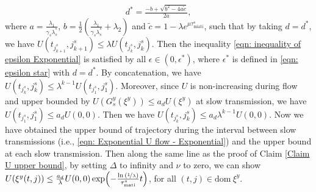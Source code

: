 \begin{equation}
d^* = \tfrac{-b+\sqrt{b^2-4a \tilde{c}}}{2a},
\label{eqn: d star exponential}
\end{equation}
where $a = \tfrac{\lambda_1}{\gamma_s \lambda_s^*}$, $b= \tfrac{1}{2}( \tfrac{\lambda_1}{\gamma_s \lambda_s^*} + \lambda_2)$ and $\tilde{c}= 1 - \lambda e^{\mu \tau_{\text{miati}}^s}$, such that by taking $d =d^*$, we have $U(t_{j_{k+1}^s}, j^s_{k+1}) \leq \lambda U(t_{j_k^s},j^s_k)$.
Then the inequality \eqref{eqn: inequality of epsilon Exponential} is satisfied by all $\epsilon \in (0, \epsilon^*)$, where $\epsilon^*$ is defined in \eqref{eqn: epsilon star} with $d = d^*$.
By concatenation, we have $U(t_{j_k^s}, j^s_k) \leq  \lambda^{k-1}U(t_{j_1^s}, j_1^s)$.
%
Moreover, since $U$ is non-increasing during flow and upper bounded by $U(G_s^y(\xi^y)) \leq a_d U(\xi^y)$ at slow transmission, we have $ U(t_{j_1^s},j_1^s) \leq  a_d U(0,0) $. Then we have $U(t_{j_k^s}, j_k^s) \leq a_d \lambda^{k-1} U(0,0)$.
%
Now we have obtained the upper bound of trajectory during the interval between slow transmissions (i.e., \eqref{eqn: Exponential U flow - Exponential}) and the upper bound at each slow transmission. 
%
Then along the same line as the proof of Claim \ref{Claim U upper bound}, by setting $\Delta$ to infinity and $\nu$ to zero, we can show $U(\xi^y(t,j)) \leq \frac{a_d}{\lambda}U(0,0)  \exp \!\left(-\tfrac{\ln{(\nicefrac{1}{\lambda})}}{\tau_{\text{mati}}^s} t \right)$,
%
for all $(t,j) \in  \text{dom} \ \xi^y$.
%
